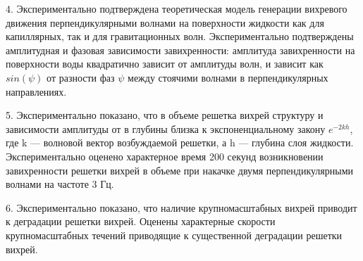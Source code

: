 4. Экспериментально подтверждена теоретическая модель генерации вихревого движения перпендикулярными волнами на поверхности жидкости как для капиллярных, так и для гравитационных волн. Экспериментально подтверждены амплитудная и фазовая зависимости завихренности: амплитуда завихренности на поверхности воды квадратично зависит от амплитуды волн, и зависит как $sin(\psi)$ от разности фаз $\psi$ между стоячими волнами в перпендикулярных направлениях. 

5. Экспериментально показано, что в объеме решетка вихрей структуру и зависимости амплитуды от в глубины близка к  экспоненциальному закону $e^{-2kh}$, где k — волновой вектор возбуждаемой решетки, а h — глубина слоя жидкости. 
Экспериментально оценено характерное время 200 секунд возникновении завихренности решетки вихрей в объеме при накачке двумя перпендикулярными волнами на частоте 3 Гц.

6. Экспериментально показано, что наличие крупномасштабных вихрей приводит к деградации решетки вихрей. Оценены характерные скорости крупномасштабных течений приводящие к существенной деградации решетки вихрей.


